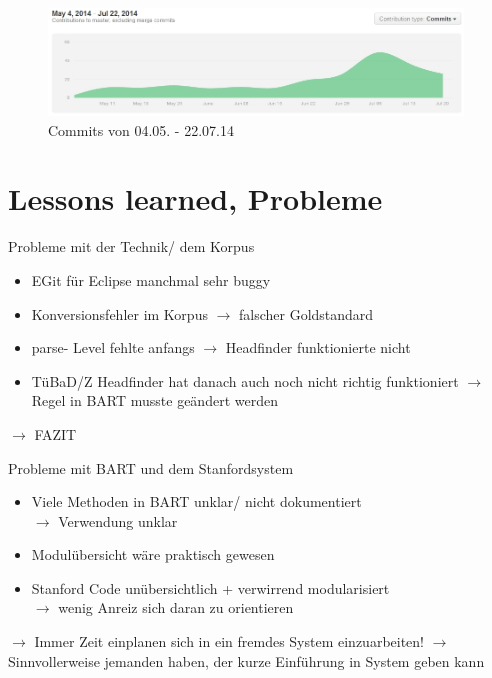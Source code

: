 \documentclass[11pt,a4paper]{beamer}
\begin{document}
\begin{frame}
\begin{figure}
\begin{center}
\includegraphics[width=11cm]{contributions_to_master.jpg}
\caption{Commits von 04.05. - 22.07.14}
\label{fig:contributions}
\end{center}
\end{figure}
\end{frame}


\section{Lessons learned, Probleme}
\begin{frame}{Probleme mit der Technik/ dem Korpus}
\begin{itemize}
\item EGit für Eclipse manchmal sehr buggy
\item Konversionsfehler im Korpus $\rightarrow$ falscher Goldstandard
\item parse- Level fehlte anfangs $\rightarrow$ Headfinder funktionierte nicht
\item TüBaD/Z Headfinder hat danach auch noch nicht richtig funktioniert $\rightarrow$ Regel in BART musste geändert werden
\end{itemize}
$\rightarrow$  FAZIT

\end{frame}


\begin{frame}{Probleme mit BART und dem Stanfordsystem}
\begin{itemize}
\item Viele Methoden in BART unklar/ nicht dokumentiert \\$\rightarrow$  Verwendung unklar
\item Modulübersicht wäre praktisch gewesen
\item Stanford Code unübersichtlich + verwirrend modularisiert\\$\rightarrow$ wenig Anreiz sich daran zu orientieren
\end{itemize}
$\rightarrow$ Immer Zeit einplanen sich in ein fremdes System einzuarbeiten!
$\rightarrow$ Sinnvollerweise jemanden haben, der kurze Einführung in System geben kann
\end{frame}
\end{document}
